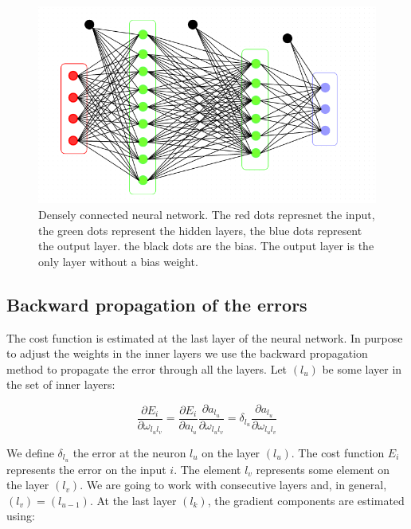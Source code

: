 \documentclass[final, paper=letter,5p,times,twocolumn]{elsarticle}
\begin{document}
\begin{figure}[htbp]
   \begin{center}
      \includegraphics[scale=0.3, angle=0]{images/densely_connected_nn.png}
   \end{center}
   \caption{Densely connected neural network. The red dots represnet the input, the green dots represent the hidden layers, the blue dots represent the output layer. the black dots are the bias. The output layer is the only layer without a bias weight.}
  \label{fig:Densely_connected_neural_network} 
\end{figure}


\subsection{Backward propagation of the errors}

The cost function is estimated at the last layer of the neural network. In purpose to adjust the weights in the inner layers we use the backward propagation method to propagate the error through all the layers. Let $(l_{u})$ be some layer in the set of inner layers:

\begin{equation*}
  \frac{\partial E_{i}}{\partial \omega_{l_{u}l_{v}}} = \frac{\partial E_{i}}{\partial a_{l_{u}}} \frac{\partial a_{l_{u}}}{\partial \omega_{l_{u}l_{v}}} = \delta_{l_{u}}\frac{\partial a_{l_{u}}}{\partial \omega_{l_{u}l_{v}}} 
\end{equation*}

We define $\delta_{l_{u}}$ the error at the neuron $l_{u}$ on the layer $(l_{u})$. The cost function $E_{i}$ represents the error on the input $i$. The element $l_{v}$ represents some element on the layer $(l_{v})$. We are going to work with consecutive layers and, in general, $(l_{v}) = (l_{u-1})$. At the last layer $(l_{k})$, the gradient components are estimated using:
\end{document}
